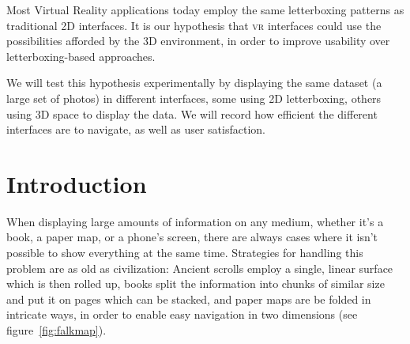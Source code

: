 \documentclass{tufte-book} %
\begin{document}
Most Virtual Reality applications today employ the same letterboxing patterns as traditional 2D interfaces. It is our hypothesis that \textsc{vr} interfaces could use the possibilities afforded by the 3D environment, in order to improve usability over letterboxing-based approaches.

We will test this hypothesis experimentally by displaying the same dataset (a large set of photos) in different interfaces, some using 2D letterboxing, others using 3D space to display the data. We will record how efficient the different interfaces are to navigate, as well as user satisfaction.




\chapter{Introduction} %

When displaying large amounts of information on any medium, whether it's a book, a paper map, or a phone's screen, there are always cases where it isn't possible to show everything at the same time. Strategies for handling this problem are as old as civilization: Ancient scrolls employ a single, linear surface which is then rolled up, books split the information into chunks of similar size and put it on pages which can be stacked, and paper maps are be folded in intricate ways, in order to enable easy navigation in two dimensions (see figure~\ref{fig:falkmap}).
\end{document}
